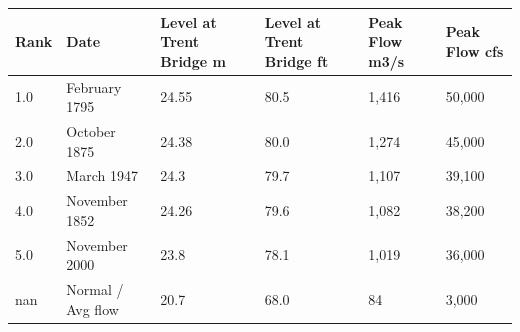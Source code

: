 \documentclass{article}
\begin{document}
\begin{tabular}{llllll}
\toprule
Rank & Date & Level at Trent Bridge m & Level at Trent Bridge ft & Peak Flow m3/s & Peak Flow cfs \\
\midrule
1.0 & February 1795 & 24.55 & 80.5 & 1,416 & 50,000 \\
2.0 & October 1875 & 24.38 & 80.0 & 1,274 & 45,000 \\
3.0 & March 1947 & 24.3 & 79.7 & 1,107 & 39,100 \\
4.0 & November 1852 & 24.26 & 79.6 & 1,082 & 38,200 \\
5.0 & November 2000 & 23.8 & 78.1 & 1,019 & 36,000 \\
nan & Normal / Avg flow & 20.7 & 68.0 & 84 & 3,000 \\
\bottomrule
\end{tabular}
\end{document}
